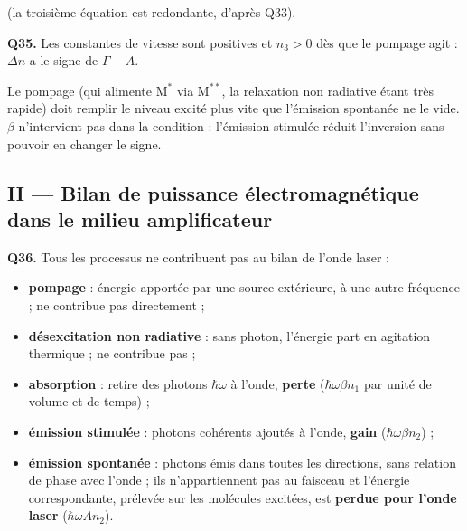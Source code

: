 \documentclass[11pt,a4paper]{article}
\providecommand{\tightlist}{\setlength{\itemsep}{0pt}\setlength{\parskip}{0pt}}
\newcommand{\equationajustee}[1]{%
  \sbox{\boiteequation}{$\displaystyle #1$}%
  \ifdim\wd\boiteequation>\linewidth
    \[\resizebox{\linewidth}{!}{\usebox{\boiteequation}}\]%
  \else
    \[#1\]%
  \fi}
\begin{document}
\equationajustee{\begin{aligned}
\Delta n&=n_2-n_1\\
&=\frac{k_{\mathrm{nr}}n_3}{\Gamma}\left(\frac{\Gamma+\beta}{A+\beta}-1\right)\\
&=\boxed{\frac{k_{\mathrm{nr}}(\Gamma-A)}{\Gamma(A+\beta)}\,n_3}
\end{aligned}}

(la troisième équation est redondante, d'après Q33).

\textbf{Q35.} Les constantes de vitesse sont positives et \(n_3>0\) dès que le pompage agit : \(\Delta n\) a le signe de \(\Gamma-A\).

\equationajustee{\boxed{\Delta n>0\iff\Gamma>A}}

Le pompage (qui alimente \(\mathrm M^*\) via \(\mathrm M^{**}\), la relaxation non radiative étant très rapide) doit remplir le niveau excité plus vite que l'émission spontanée ne le vide. \(\beta\) n'intervient pas dans la condition : l'émission stimulée réduit l'inversion sans pouvoir en changer le signe.

\hypertarget{ii-bilan-de-puissance-uxe9lectromagnuxe9tique-dans-le-milieu-amplificateur}{%
\subsection{II --- Bilan de puissance électromagnétique dans le milieu amplificateur}\label{ii-bilan-de-puissance-uxe9lectromagnuxe9tique-dans-le-milieu-amplificateur}}

\textbf{Q36.} Tous les processus ne contribuent pas au bilan de l'onde laser :

\begin{itemize}
\tightlist
\item
  \textbf{pompage} : énergie apportée par une source extérieure, à une autre fréquence ; ne contribue pas directement ;
\item
  \textbf{désexcitation non radiative} : sans photon, l'énergie part en agitation thermique ; ne contribue pas ;
\item
  \textbf{absorption} : retire des photons \(\hbar\omega\) à l'onde, \textbf{perte} (\(\hbar\omega\beta n_1\) par unité de volume et de temps) ;
\item
  \textbf{émission stimulée} : photons cohérents ajoutés à l'onde, \textbf{gain} (\(\hbar\omega\beta n_2\)) ;
\item
  \textbf{émission spontanée} : photons émis dans toutes les directions, sans relation de phase avec l'onde ; ils n'appartiennent pas au faisceau et l'énergie correspondante, prélevée sur les molécules excitées, est \textbf{perdue pour l'onde laser} (\(\hbar\omega An_2\)).
\end{itemize}
\end{document}

